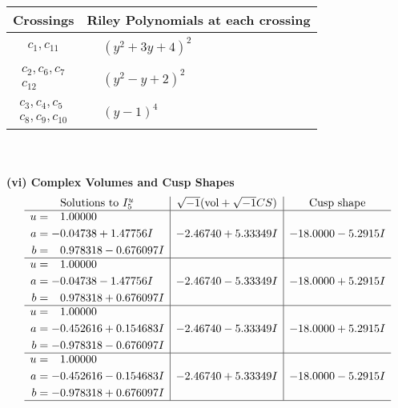 \documentclass[1p]{elsarticle_modified}
\theoremstyle{definition}
\newcommand{\I}{\sqrt{-1}}
\begin{document}
\begin{tabular}{m{50pt}|m{274pt}}
Crossings & \hspace{64pt}Riley Polynomials at each crossing \\
\hline $$\begin{aligned}c_{1},c_{11}\end{aligned}$$&$\begin{aligned}
&(y^2+3 y+4)^2
\end{aligned}$\\
\hline $$\begin{aligned}c_{2},c_{6},c_{7}\\c_{12}\end{aligned}$$&$\begin{aligned}
&(y^2- y+2)^2
\end{aligned}$\\
\hline $$\begin{aligned}c_{3},c_{4},c_{5}\\c_{8},c_{9},c_{10}\end{aligned}$$&$\begin{aligned}
&(y-1)^4
\end{aligned}$\\
\hline
\end{tabular}\\~\\
\newpage\flushleft \textbf{(vi) Complex Volumes and Cusp Shapes}
$$\begin{array}{c|c|c}  
\text{Solutions to }I^u_{5}& \I (\text{vol} + \sqrt{-1}CS) & \text{Cusp shape}\\
 \hline 
\begin{aligned}
u &= \phantom{-}1.00000\phantom{ +0.000000I} \\
a &= -0.04738 + 1.47756 I \\
b &= \phantom{-}0.978318 - 0.676097 I\end{aligned}
 & -2.46740 + 5.33349 I & -18.0000 - 5.2915 I \\ \hline\begin{aligned}
u &= \phantom{-}1.00000\phantom{ +0.000000I} \\
a &= -0.04738 - 1.47756 I \\
b &= \phantom{-}0.978318 + 0.676097 I\end{aligned}
 & -2.46740 - 5.33349 I & -18.0000 + 5.2915 I \\ \hline\begin{aligned}
u &= \phantom{-}1.00000\phantom{ +0.000000I} \\
a &= -0.452616 + 0.154683 I \\
b &= -0.978318 - 0.676097 I\end{aligned}
 & -2.46740 - 5.33349 I & -18.0000 + 5.2915 I \\ \hline\begin{aligned}
u &= \phantom{-}1.00000\phantom{ +0.000000I} \\
a &= -0.452616 - 0.154683 I \\
b &= -0.978318 + 0.676097 I\end{aligned}
 & -2.46740 + 5.33349 I & -18.0000 - 5.2915 I\\
 \hline 
 \end{array}$$\newpage\newpage\renewcommand{\arraystretch}{1}
\end{document}
